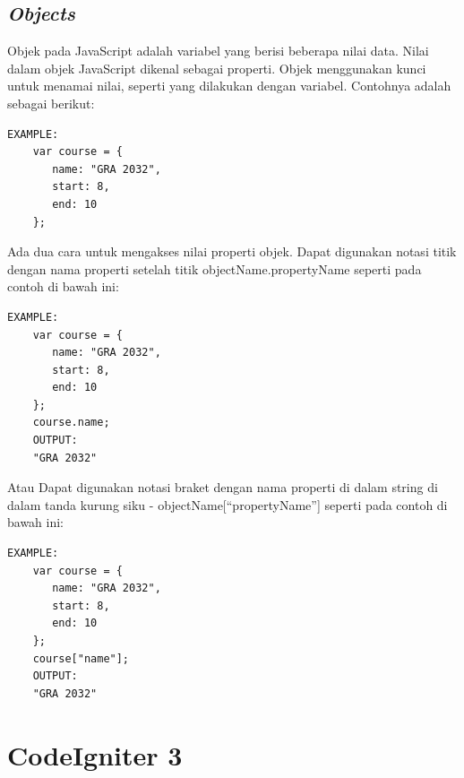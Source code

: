 \subsection{\textit{Objects}}
\label{sec: Objects}
Objek pada JavaScript adalah variabel yang berisi beberapa nilai data. Nilai dalam objek JavaScript dikenal sebagai properti\cite{javascriptlearn}. Objek menggunakan kunci untuk menamai nilai, seperti yang dilakukan dengan variabel. Contohnya adalah sebagai berikut: 
    \begin{lstlisting}[basicstyle=\ttfamily, frame=single,
    columns=fullflexible, breaklines=true, numbers=none]
    EXAMPLE:
    var course = {
       name: "GRA 2032",
       start: 8,
       end: 10
    };
    \end{lstlisting}
    Ada dua cara untuk mengakses nilai properti objek. Dapat digunakan notasi titik dengan nama properti setelah titik objectName.propertyName seperti pada contoh di bawah ini:
    \begin{lstlisting}[basicstyle=\ttfamily, frame=single,
    columns=fullflexible, breaklines=true, numbers=none]
    EXAMPLE:
    var course = {
       name: "GRA 2032",
       start: 8,
       end: 10
    };
    course.name;
    OUTPUT:
    "GRA 2032"
    \end{lstlisting}
    Atau Dapat digunakan notasi braket dengan nama properti di dalam string di dalam tanda kurung siku - objectName[“propertyName”] seperti pada contoh di bawah ini:
    \begin{lstlisting}[basicstyle=\ttfamily, frame=single,
    columns=fullflexible, breaklines=true, numbers=none]
    EXAMPLE:
    var course = {
       name: "GRA 2032",
       start: 8,
       end: 10
    };
    course["name"];
    OUTPUT:
    "GRA 2032"
    \end{lstlisting}
    
\section{CodeIgniter 3}
\label{sec:CodeIgniter} 
 
